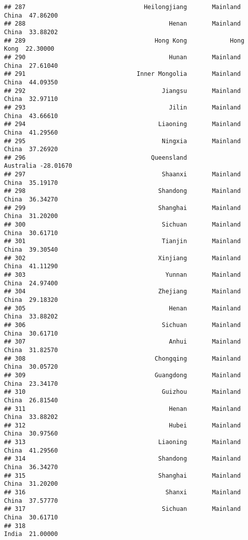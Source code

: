 \documentclass[
]{article}
\begin{document}
\begin{verbatim}
## 287                                 Heilongjiang       Mainland China  47.86200
## 288                                        Henan       Mainland China  33.88202
## 289                                    Hong Kong            Hong Kong  22.30000
## 290                                        Hunan       Mainland China  27.61040
## 291                               Inner Mongolia       Mainland China  44.09350
## 292                                      Jiangsu       Mainland China  32.97110
## 293                                        Jilin       Mainland China  43.66610
## 294                                     Liaoning       Mainland China  41.29560
## 295                                      Ningxia       Mainland China  37.26920
## 296                                   Queensland            Australia -28.01670
## 297                                      Shaanxi       Mainland China  35.19170
## 298                                     Shandong       Mainland China  36.34270
## 299                                     Shanghai       Mainland China  31.20200
## 300                                      Sichuan       Mainland China  30.61710
## 301                                      Tianjin       Mainland China  39.30540
## 302                                     Xinjiang       Mainland China  41.11290
## 303                                       Yunnan       Mainland China  24.97400
## 304                                     Zhejiang       Mainland China  29.18320
## 305                                        Henan       Mainland China  33.88202
## 306                                      Sichuan       Mainland China  30.61710
## 307                                        Anhui       Mainland China  31.82570
## 308                                    Chongqing       Mainland China  30.05720
## 309                                    Guangdong       Mainland China  23.34170
## 310                                      Guizhou       Mainland China  26.81540
## 311                                        Henan       Mainland China  33.88202
## 312                                        Hubei       Mainland China  30.97560
## 313                                     Liaoning       Mainland China  41.29560
## 314                                     Shandong       Mainland China  36.34270
## 315                                     Shanghai       Mainland China  31.20200
## 316                                       Shanxi       Mainland China  37.57770
## 317                                      Sichuan       Mainland China  30.61710
## 318                                                             India  21.00000

\end{verbatim}
\end{document}
